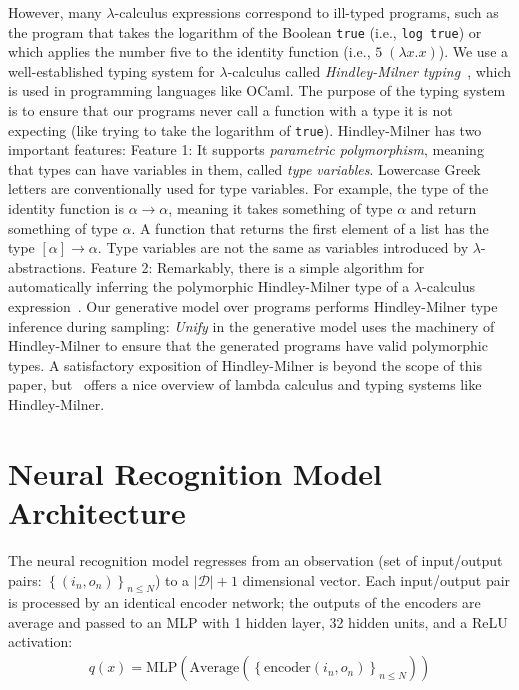 \documentclass{article}
\begin{document}
However, many $\lambda$-calculus expressions correspond to ill-typed programs, such as the program that takes the logarithm of the Boolean \texttt{true} (i.e., \texttt{log true}) or which applies the number five to the identity function
(i.e., $5 \; (\lambda x.x)$).
We use a well-established typing system for $\lambda$-calculus called \emph{Hindley-Milner typing}~\cite{pierce}, which is used in programming languages like OCaml.
The purpose of the typing system is to ensure that our programs never call a function with a type it is not expecting (like trying to take the logarithm of \texttt{true}).
Hindley-Milner has two important features:
Feature 1: It supports \emph{parametric polymorphism}, meaning that types can have variables in them, called \emph{type variables}. Lowercase Greek letters are conventionally used for  type variables.
For example, the type of the identity function is $\alpha\to\alpha$, meaning it takes something of type $\alpha$ and return something of type $\alpha$. A function that returns the first element of a list has the type $[\alpha]\to\alpha$. Type variables are not the same as variables introduced by $\lambda$-abstractions.
Feature 2: Remarkably, there is a  simple algorithm for automatically inferring the polymorphic Hindley-Milner type of a $\lambda$-calculus expression~\cite{damas1982principal}.
Our generative model over programs performs Hindley-Milner type inference during sampling:
\emph{Unify} in the generative model uses the machinery of Hindley-Milner to
ensure that the generated programs have valid polymorphic types.
A satisfactory exposition of Hindley-Milner is beyond the scope of this paper,
but~\cite{pierce} offers a nice overview of lambda calculus and typing systems like Hindley-Milner.


\section{Neural Recognition Model Architecture}

The neural recognition model regresses from an observation (set of input/output pairs: $\left\{(i_n,o_n) \right\}_{n\leq N}$) to a $|\mathcal{D}| + 1$ dimensional vector. Each input/output pair is processed by an identical encoder network;
the outputs of the encoders are average and passed to an MLP with 1 hidden layer, 32 hidden units, and a ReLU activation:
\begin{align}
  q(x) = \text{MLP}\left(\text{Average}\left(\left\{\text{encoder}\left(i_n,o_n \right) \right\}_{n\leq N} \right) \right)
\end{align}
\end{document}
